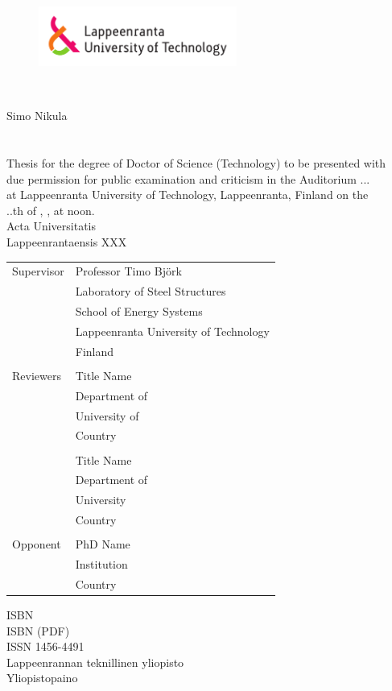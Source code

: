 
\thispagestyle{empty} \setlength{\parindent}{0pt}
\begin{figure}
\includegraphics[width=65mm]{./figs/Merkki_Logo_CMYK}\\
\end{figure}
~\\

\vspace{60mm}

{\sffamily\large Simo Nikula\\
\\
\MakeUppercase{\Large \mytitle
}}\\

{\sffamily\footnotesize Thesis for the degree of Doctor of Science (Technology) to be presented with\\
due permission for public examination and criticism in the Auditorium ...\\
at Lappeenranta University of Technology, Lappeenranta, Finland on the\\
..th of \mymonth, \myyear, at noon.}\\

{\sffamily\normalsize Acta Universitatis\\
Lappeenrantaensis XXX}

\pagebreak

\thispagestyle{empty}


\begin{tabular}{l p{11.0cm}}Supervisor& Professor Timo Björk\\
&Laboratory of Steel Structures\\
&School of Energy Systems\\
&Lappeenranta University of Technology\\
&Finland\\
\\
Reviewers& Title Name\\
&Department of \\
&University of \\
&Country\\
\\
& Title Name\\
&Department of \\
&University\\
&Country\\

\\
Opponent& PhD Name\\
&Institution\\
&Country\\
\end {tabular}



\begin{center}
ISBN \myisbn\\
ISBN \mypdfisbn (PDF)\\
ISSN 1456-4491\\
Lappeenrannan teknillinen yliopisto\\
Yliopistopaino \myyear

 \end{center}
\pagebreak

